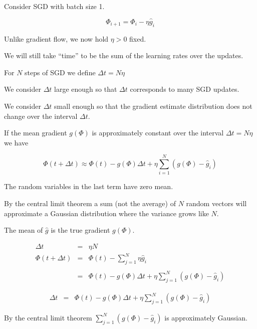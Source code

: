 {


\vfill
Consider SGD with batch size 1.

$$\Phi_{i+1} = \Phi_i - \eta\hat{g}_i$$

\vfill
Unlike gradient flow, we now hold $\eta > 0$ fixed.

\vfill
We will still take ``time'' to be the sum of the learning rates over the updates.

\vfill
For $N$ steps of SGD we define $\Delta t = N \eta$


We consider $\Delta t$ large enough so that $\Delta t$ corresponds to many SGD updates.

\vfill
We consider $\Delta t$ small enough so that the gradient estimate distribution does not change over the interval $\Delta t$.


If the mean gradient $g(\Phi)$ is approximately constant over the interval $\Delta t = N \eta$ we have

$$\Phi(t + \Delta t)  \approx \Phi(t) -g(\Phi)\Delta t + \eta \sum_{i=1}^N (g(\Phi) - \hat{g}_i)$$

\vfill
The random variables in the last term have zero mean.

\vfill
By the central limit theorem a sum (not the average) of $N$ random vectors will approximate a Gaussian distribution where the variance
grows like $N$.


The mean of $\hat{g}$ is the true gradient $g(\Phi)$.  

\begin{eqnarray*}
\Delta t & = & \eta N \\
\Phi(t + \Delta t) &  = & \Phi(t) - \sum_{j=1}^N \eta\hat{g}_i \\
\\
 &  = & \Phi(t) -g(\Phi)\Delta t + \eta \sum_{j=1}^N (g(\Phi) - \hat{g}_i)
\end{eqnarray*}


\begin{eqnarray*}
\Delta t & = &  \Phi(t) -g(\Phi)\Delta t + \eta \sum_{j=1}^N (g(\Phi) - \hat{g}_i)
\end{eqnarray*}


\vfill
By the central limit theorem $\sum_{j=1}^N (g(\Phi) - \hat{g}_i)$ is approximately Gaussian.

}
